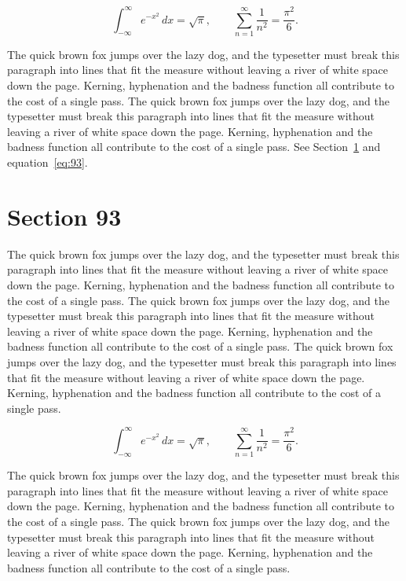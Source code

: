 \documentclass{article}
\begin{document}
\begin{equation}\label{eq:92}
\int_{-\infty}^{\infty} e^{-x^{2}}\,dx = \sqrt{\pi}, \qquad
\sum_{n=1}^{\infty} \frac{1}{n^{2}} = \frac{\pi^{2}}{6}.
\end{equation}

The quick brown fox jumps over the lazy dog, and the typesetter must break this paragraph into lines that fit the measure without leaving a river of white space down the page. Kerning, hyphenation and the badness function all contribute to the cost of a single pass. The quick brown fox jumps over the lazy dog, and the typesetter must break this paragraph into lines that fit the measure without leaving a river of white space down the page. Kerning, hyphenation and the badness function all contribute to the cost of a single pass. 
See Section~\ref{sec:93} and equation~\eqref{eq:93}.
\section{Section 93}
\label{sec:93}
The quick brown fox jumps over the lazy dog, and the typesetter must break this paragraph into lines that fit the measure without leaving a river of white space down the page. Kerning, hyphenation and the badness function all contribute to the cost of a single pass. The quick brown fox jumps over the lazy dog, and the typesetter must break this paragraph into lines that fit the measure without leaving a river of white space down the page. Kerning, hyphenation and the badness function all contribute to the cost of a single pass. The quick brown fox jumps over the lazy dog, and the typesetter must break this paragraph into lines that fit the measure without leaving a river of white space down the page. Kerning, hyphenation and the badness function all contribute to the cost of a single pass. 

\begin{equation}\label{eq:93}
\int_{-\infty}^{\infty} e^{-x^{2}}\,dx = \sqrt{\pi}, \qquad
\sum_{n=1}^{\infty} \frac{1}{n^{2}} = \frac{\pi^{2}}{6}.
\end{equation}

The quick brown fox jumps over the lazy dog, and the typesetter must break this paragraph into lines that fit the measure without leaving a river of white space down the page. Kerning, hyphenation and the badness function all contribute to the cost of a single pass. The quick brown fox jumps over the lazy dog, and the typesetter must break this paragraph into lines that fit the measure without leaving a river of white space down the page. Kerning, hyphenation and the badness function all contribute to the cost of a single pass. 
\end{document}
